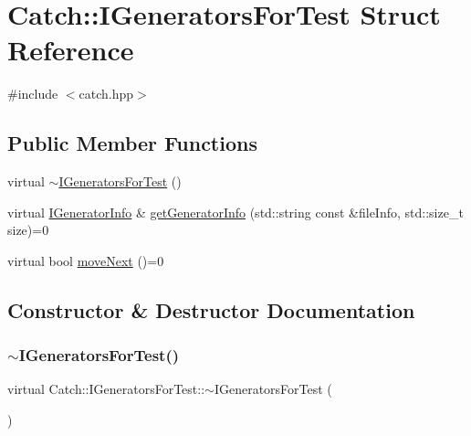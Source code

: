 \hypertarget{struct_catch_1_1_i_generators_for_test}{}\section{Catch\+:\+:I\+Generators\+For\+Test Struct Reference}
\label{struct_catch_1_1_i_generators_for_test}


{\ttfamily \#include $<$catch.\+hpp$>$}

\subsection*{Public Member Functions}
\begin{DoxyCompactItemize}
\item 
virtual \hyperlink{struct_catch_1_1_i_generators_for_test_a05725e76ee92e498f73479a61f3e3c7c}{$\sim$\+I\+Generators\+For\+Test} ()
\item 
virtual \hyperlink{struct_catch_1_1_i_generator_info}{I\+Generator\+Info} \& \hyperlink{struct_catch_1_1_i_generators_for_test_a180d84e858840188e4c3788e47eefdb0}{get\+Generator\+Info} (std\+::string const \&file\+Info, std\+::size\+\_\+t size)=0
\item 
virtual bool \hyperlink{struct_catch_1_1_i_generators_for_test_adab31832d529fc584fd63164e0a1c8ad}{move\+Next} ()=0
\end{DoxyCompactItemize}


\subsection{Constructor \& Destructor Documentation}
\hypertarget{struct_catch_1_1_i_generators_for_test_a05725e76ee92e498f73479a61f3e3c7c}{}\label{struct_catch_1_1_i_generators_for_test_a05725e76ee92e498f73479a61f3e3c7c} 
\subsubsection{\texorpdfstring{$\sim$\+I\+Generators\+For\+Test()}{~IGeneratorsForTest()}}
{\footnotesize\ttfamily virtual Catch\+::\+I\+Generators\+For\+Test\+::$\sim$\+I\+Generators\+For\+Test (\begin{DoxyParamCaption}{ }\end{DoxyParamCaption})\hspace{0.3cm}{\ttfamily [virtual]}}



